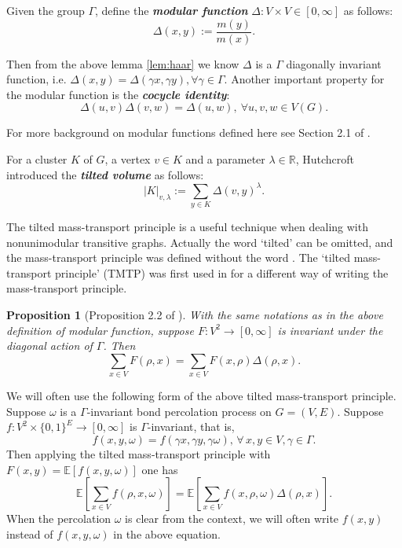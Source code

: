 \documentclass[12pt]{article}
\newtheorem{proposition}[theorem]{Proposition}
\numberwithin{equation}{section}
\newcommand{\1}{\mathbf{1}}
\newcommand{\notion}[1]{{\bf  \textit{#1}}}
\begin{document}
  
 Given the group $\Gamma$, define the \notion{modular function} $\Delta:V\times V\in[0,\infty]$ as follows:
 \[
 \Delta(x,y):=\frac{m(y)}{m(x)}.
 \]
 
 Then from the above lemma \ref{lem:haar} we know $\Delta$ is a $\Gamma$ diagonally invariant function, i.e. $\Delta(x,y)=\Delta(\gamma x,\gamma y), \forall \gamma\in\Gamma$. Another important property for the modular function is the \notion{cocycle identity}:
 \[
 \Delta(u,v)\Delta(v,w)=\Delta(u,w),\ \forall u,v,w\in V(G).
 \] 
 
 
 For more background on modular functions defined here see Section 2.1 of \cite{Tom2017}. 
 
 For a cluster $K$ of $G$, a vertex $v\in K$ and a parameter $\lambda\in\mathbb{R}$,  Hutchcroft \cite{Tom2017} introduced the \notion{tilted volume} as follows:
 \[
 |K|_{v,\lambda}:=\sum_{y\in K}\Delta(v,y)^\lambda.
 \]
 
 The tilted mass-transport principle  is a useful technique when dealing with nonunimodular transitive graphs.  Actually the word `tilted' can be omitted, and  the mass-transport principle was defined without the word \cite{BLPS1999}. The `tilted mass-transport principle' (TMTP) was first used in \cite{Tom2017} for a different way of writing the mass-transport principle. 
 
 \begin{proposition}[Proposition 2.2  of \cite{Tom2017}]\label{prop:TMTP}
 	With the same notations as in the above definition of modular function, suppose $F:V^2\rightarrow[0,\infty]$ is invariant under the diagonal action of $\Gamma$.  Then 
 	\[
 \sum_{x\in V}{F(\rho,x)}=\sum_{x\in V}{F(x,\rho)\Delta(\rho,x)}.
 	\]
 \end{proposition}



 We will often use the following form of the above tilted mass-transport principle. Suppose $\omega$ is a $\Gamma$-invariant bond percolation process on $G=(V,E)$. Suppose $f:V^2\times\{0,1\}^E\rightarrow [0,\infty]$ is $\Gamma$-invariant, that is,
 \[
 f(x,y,\omega)=f(\gamma x,\gamma y,\gamma \omega), \, \forall\, x,y\in V, \gamma\in \Gamma. 
 \]
 Then applying the tilted mass-transport principle with $F(x,y)=\mathbb{E}[f(x,y,\omega)]$ one has
 \begin{equation}\label{eq:TMTP with percolation}
 \mathbb{E}\left[\sum_{x\in V}{f(\rho,x,\omega)}\right]=\mathbb{E}\left[\sum_{x\in V}{f(x,\rho,\omega)\Delta(\rho,x)}\right].
 \end{equation}
 When the percolation $\omega$ is clear from the context, we will often write $f(x,y)$ instead of $f(x,y,\omega)$ in the above equation.
 
\end{document}
